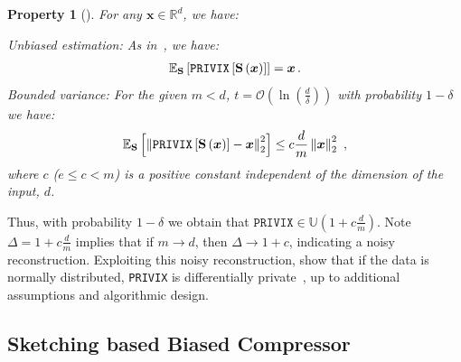 \documentclass{article}
\newtheorem{property}{Property}
\begin{document}
\begin{property}[\citep{li2019privacy}]
For any $\boldsymbol{x}\in \mathbb{R}^{d}$, we have:

\textit{Unbiased estimation}: As in~\citet{li2019privacy}, we have:
    \begin{align}\notag
        \mathbb{E}_{\mathbf{S}}\left[\texttt{PRIVIX}\left[\mathbf{S}\left(\boldsymbol{x}\right)\right]\right]=\boldsymbol{x}\, .
    \end{align}
\textit{Bounded variance:} For the given $m<d$, $t=\mathcal{O}\left(\ln \left(\frac{d}{\delta}\right)\right)$ with probability $1-\delta$ we have:
    \begin{align}\notag
        \mathbb{E}_{\mathbf{S}}\left[\left\|\texttt{PRIVIX}\left[\mathbf{S}\left(\boldsymbol{x}\right)\right]-\boldsymbol{x}\right\|_2^2\right] \leq c\frac{d}{m}\left\|\boldsymbol{x}\right\|_2^2\ , 
    \end{align}
 where $c$ ($e\leq c<m$) is a positive constant independent of the dimension of the input, $d$.
\end{property}
Thus, with probability $1-\delta$ we obtain that $\texttt{PRIVIX}\in \mathbb{U}(1+c\frac{d}{m})$.
Note $\Delta=1+c\frac{d}{m}$ implies that if $m\rightarrow d$, then $\Delta\rightarrow 1+c$, indicating a noisy reconstruction. 
Exploiting this noisy reconstruction, \citet{li2019privacy} show that if the data is normally distributed, \texttt{PRIVIX} is differentially private~\citep{DBLP:conf/icalp/Dwork06}, up to additional assumptions and algorithmic design.  


\vspace{-0.05in}
\subsection{Sketching based Biased Compressor}
\vspace{-0.05in}
\end{document}

